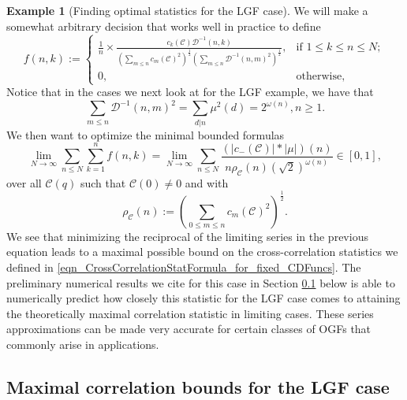 \documentclass[12pt,reqno,a4letter]{article}
\numberwithin{figure}{section}
\numberwithin{table}{section}
\numberwithin{equation}{section}
\theoremstyle{plain}
\numberwithin{theorem}{section}
\theoremstyle{definition}
\newtheorem{example}[theorem]{Example}
\begin{document}
\begin{example}[Finding optimal statistics for the LGF case]
We will make a somewhat arbitrary decision that works well in practice to define 
\[
f(n,k) := \begin{cases} 
     \frac{1}{n} \times \frac{ 
     c_{k}(\mathcal{C}) \mathcal{D}^{-1}(n, k)}{ 
     \left(\sum\limits_{m \leq n} c_m(\mathcal{C})^2\right)^{\frac{1}{2}} \left( 
     \sum\limits_{m \leq n} \mathcal{D}^{-1}(n, m)^2\right)^{\frac{1}{2}}}, 
     & \text{if\ } 1 \leq k \leq n \leq N; \\ 
     0, & \text{otherwise,}
     \end{cases}
\]
Notice that in the cases we next look at for the LGF example, we have that 
\[
\sum_{m \leq n} \mathcal{D}^{-1}(n, m)^2 = \sum_{d|n} \mu^2(d) = 2^{\omega(n)}, n \geq 1. 
\]
We then want to optimize the minimal bounded formulas 
\[
\lim_{N \rightarrow \infty} \sum_{n \leq N} \sum_{k=1}^n f(n, k) 
     = \lim_{N \rightarrow \infty} 
     \sum_{n \leq N} \frac{(|c_{-}(\mathcal{C})| \ast |\mu|)(n)}{ 
     n \rho_{\mathcal{C}}(n) \left(\sqrt{2}\right)^{\omega(n)}} 
     \in [0, 1], 
\]
over all $\mathcal{C}(q)$ such that $\mathcal{C}(0) \neq 0$ and with 
$$\rho_{\mathcal{C}}(n) := \left(\sum_{0 \leq m \leq n} c_m(\mathcal{C})^2\right)^{\frac{1}{2}}.$$
We see that minimizing the reciprocal of the limiting series in the previous equation leads to a maximal 
possible bound on the cross-correlation statistics we defined in 
\eqref{eqn_CrossCorrelationStatFormula_for_fixed_CDFuncs}.
The preliminary numerical results we cite for this case in 
Section \ref{subSection_LGF_TheoreticalAnalysisOfBestPossibleBoundsForCorrStats} below 
is able to numerically predict how closely this statistic for the LGF case comes to attaining the 
theoretically maximal correlation statistic in limiting cases. 
These series approximations can be made very accurate for certain classes of OGFs that 
commonly arise in applications. 
\end{example}

\subsection{Maximal correlation bounds for the LGF case} 
\label{subSection_LGF_TheoreticalAnalysisOfBestPossibleBoundsForCorrStats} 
\end{document}

